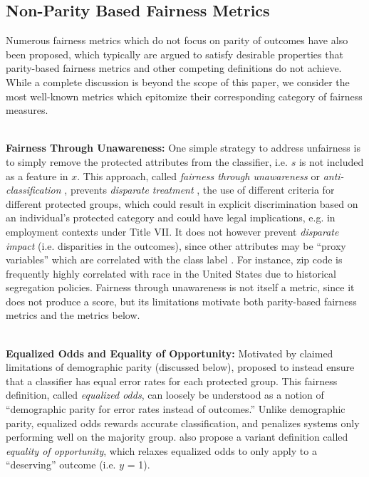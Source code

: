 \documentclass[11pt,dvipdfm]{article}
\begin{document}
\subsection{Non-Parity Based Fairness Metrics}
Numerous fairness metrics which do not focus on parity of outcomes have also been proposed, which typically are argued to satisfy desirable properties that parity-based fairness metrics and other competing definitions do not achieve.  While a complete discussion is beyond the scope of this paper, we consider the most well-known metrics which epitomize their corresponding category of fairness measures. 

\ \\
\noindent \textbf{Fairness Through Unawareness:}
One simple strategy to address unfairness is to simply remove the protected attributes from the classifier, i.e. $s$ is not included as a feature in $x$.  This approach, called \emph{fairness through unawareness} \cite{dwork2012fairness} or \emph{anti-classification} \cite{corbettdavies2018measure}, prevents \emph{disparate treatment} \cite{zafar2015fairness}, the use of different criteria for different protected groups, which could result in explicit discrimination based on an individual's protected category and could have legal implications, e.g. in employment contexts under Title VII.  It does not however prevent \emph{disparate impact} (i.e. disparities in the outcomes), since other attributes may be ``proxy variables'' which are correlated with the class label \cite{barocas2016big}.  For instance, zip code is frequently highly correlated with race in the United States due to historical segregation policies.  Fairness through unawareness is not itself a metric, since it does not produce a score, but its limitations motivate both parity-based fairness metrics and the metrics below. 


\ \\
\noindent \textbf{Equalized Odds and Equality of Opportunity:} Motivated by claimed limitations of demographic parity (discussed below), \cite{hardt2016equality} proposed to instead ensure that a classifier has equal error rates for each protected group.  This fairness definition, called \emph{equalized odds}, can loosely be understood as a notion of ``demographic parity for error rates instead of outcomes.''  Unlike demographic parity, equalized odds rewards accurate classification, and penalizes systems only performing well on the majority group.  %
\cite{hardt2016equality} also propose a variant definition called \emph{equality of opportunity}, which relaxes equalized odds to only apply to a ``deserving'' outcome (i.e. $y$ = 1). 
\end{document}
